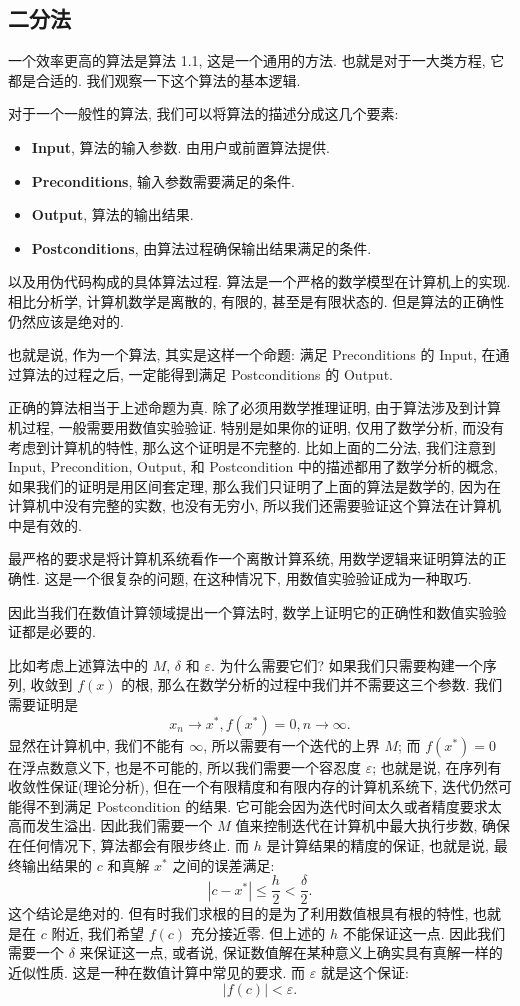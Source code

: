 \documentclass[a4paper]{ctexart}
\newcommand{\remark}[1]
{\noindent {\bf Remark {#1}}}
\begin{document}
\subsection{二分法}
一个效率更高的算法是算法 1.1, 这是一个通用的方法. 也就是对于一大类方程, 它都是合适的. 
我们观察一下这个算法的基本逻辑.

对于一个一般性的算法, 我们可以将算法的描述分成这几个要素:
\begin{itemize}
  \item {\bf Input}, 算法的输入参数. 由用户或前置算法提供.
  \item {\bf Preconditions}, 输入参数需要满足的条件. 
  \item {\bf Output}, 算法的输出结果.
  \item {\bf Postconditions}, 由算法过程确保输出结果满足的条件.
\end{itemize}
以及用伪代码构成的具体算法过程. 算法是一个严格的数学模型在计算机上的实现. 
相比分析学, 计算机数学是离散的, 有限的, 甚至是有限状态的. 
但是算法的正确性仍然应该是绝对的.

也就是说, 作为一个算法, 其实是这样一个命题:
满足 Preconditions 的 Input, 在通过算法的过程之后, 一定能得到满足 Postconditions 的 Output. 

正确的算法相当于上述命题为真. 除了必须用数学推理证明, 由于算法涉及到计算机过程, 一般需要用数值实验验证. 
特别是如果你的证明, 仅用了数学分析, 而没有考虑到计算机的特性, 那么这个证明是不完整的. 比如上面的二分法,
我们注意到 Input, Precondition, Output, 和 Postcondition 中的描述都用了数学分析的概念, 如果我们的证明是用区间套定理,
那么我们只证明了上面的算法是数学的, 因为在计算机中没有完整的实数, 也没有无穷小, 所以我们还需要验证这个算法在计算机中是有效的.

最严格的要求是将计算机系统看作一个离散计算系统, 用数学逻辑来证明算法的正确性. 这是一个很复杂的问题, 在这种情况下, 
用数值实验验证成为一种取巧.

因此当我们在数值计算领域提出一个算法时, 数学上证明它的正确性和数值实验验证都是必要的.

\remark{1.2} 比如考虑上述算法中的 $M$, $\delta$ 和 $\varepsilon$. 
为什么需要它们? 如果我们只需要构建一个序列, 收敛到 $f(x)$ 的根, 
那么在数学分析的过程中我们并不需要这三个参数. 我们需要证明是
$$
x_n \rightarrow x^*, f(x^*) = 0, n \to \infty.
$$
显然在计算机中, 我们不能有 $\infty$, 所以需要有一个迭代的上界 $M$;
而 $f(x^*) = 0$ 在浮点数意义下, 也是不可能的, 所以我们需要一个容忍度 $\varepsilon$;
也就是说, 在序列有收敛性保证(理论分析), 但在一个有限精度和有限内存的计算机系统下, 迭代仍然可能得不到满足 Postcondition 的结果. 
它可能会因为迭代时间太久或者精度要求太高而发生溢出. 因此我们需要一个 $M$ 值来控制迭代在计算机中最大执行步数, 确保在任何情况下,
算法都会有限步终止. 而 $h$ 是计算结果的精度的保证, 也就是说, 最终输出结果的 $c$ 和真解 $x^*$ 之间的误差满足:
\[
|c - x^*| \leq \frac{h}{2} < \frac{\delta}{2}.
\]
这个结论是绝对的. 但有时我们求根的目的是为了利用数值根具有根的特性, 也就是在 $c$ 附近, 
我们希望 $f(c)$ 充分接近零. 但上述的 $h$ 不能保证这一点. 因此我们需要一个 $\delta$ 来保证这一点, 或者说, 
保证数值解在某种意义上确实具有真解一样的近似性质. 这是一种在数值计算中常见的要求. 
而 $\varepsilon$ 就是这个保证:
\[
|f(c)| < \varepsilon. 
\]
\end{document}
